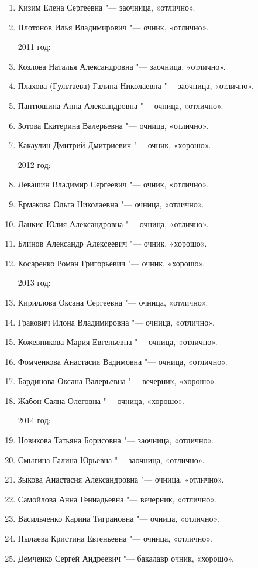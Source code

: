 \begin{enumerate}[nosep]
{2010 год:}
	\item Кизим Елена Сергеевна "--- заочница, «отлично».
	\item Плотонов Илья Владимирович "--- очник, «отлично».
	
{2011 год:}
	\item Козлова Наталья Александровна "--- заочница, «отлично».
	\item Плахова (Гультаева) Галина Николаевна "--- заочница, «отлично».
	\item Пантюшина Анна Александровна "--- очница, «отлично».
	\item Зотова Екатерина Валерьевна "--- очница, «отлично».
	\item Какаулин Дмитрий Дмитриевич "--- очник, «хорошо».
	
{2012 год:}
	\item Левашин Владимир Сергеевич "--- очник, «отлично».
	\item Ермакова Ольга Николаевна "--- очница, «отлично».
	\item Ланкис Юлия Александровна "--- очница, «отлично».
	\item Блинов Александр Алексеевич "--- очник, «хорошо».
	\item Косаренко Роман Григорьевич "--- очник, «хорошо».
	
{2013 год:}
	\item Кириллова Оксана Сергеевна "--- очница, «отлично».
	\item Гракович Илона Владимировна "--- очница, «отлично».
	\item Кожевникова Мария Евгеньевна "--- очница, «отлично».
	\item Фомченкова Анастасия Вадимовна "--- очница, «отлично».
	\item Бардинова Оксана Валерьевна "--- вечерник, «хорошо».
	\item Жабон Саяна Олеговна "--- очница, «хорошо».
	
{2014 год:}
	\item Новикова Татьяна Борисовна "--- заочница, «отлично».
	\item Смыгина Галина Юрьевна "--- заочница, «отлично».
	\item Зыкова Анастасия Александровна "--- очница, «отлично».
	\item Самойлова Анна Геннадьевна "--- вечерник, «отлично».
	\item Васильченко Карина Тиграновна "--- очница, «отлично».
	\item Пылаева Кристина Евгеньевна "--- очница, «отлично».
	\item Демченко Сергей Андреевич "--- бакалавр очник, «хорошо».
	

\end{enumerate}
